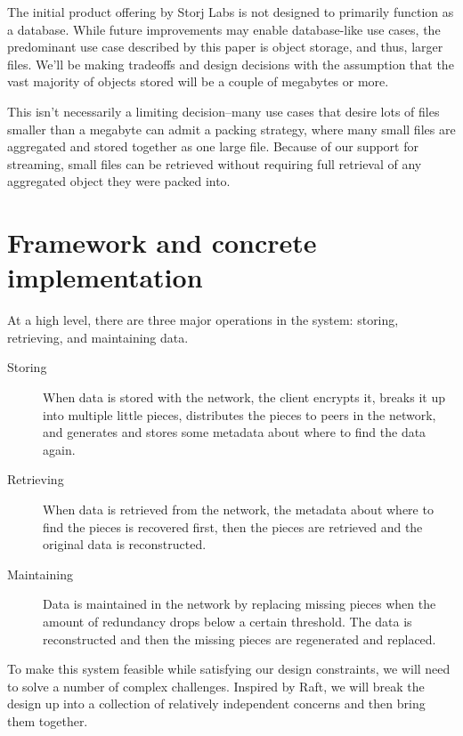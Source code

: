 \documentclass[a4paper,10pt]{article}
\begin{document}
The initial product offering by Storj Labs is not designed to primarily function
as a database. While future improvements may enable database-like use cases,
the predominant use case described by this paper is object storage, and thus,
larger files. We'll be making tradeoffs and design decisions with the assumption
that the vast majority of objects stored will be a couple of megabytes or more.

This isn't necessarily a limiting decision--many use cases that desire lots
of files smaller than a megabyte can admit a packing strategy, where many small
files are aggregated and stored together as one large file. Because of our
support for streaming, small files can be retrieved without requiring full
retrieval of any aggregated object they were packed into.

\section{Framework and concrete implementation}

At a high level, there are three major operations in the system: storing,
retrieving, and maintaining data.

\begin{description}

\item[Storing]
When data is stored with the network, the client encrypts it, breaks it up into
multiple little pieces, distributes the pieces to peers in the network, and
generates and stores some metadata about where to find the data again.

\item[Retrieving]
When data is retrieved from the network, the metadata about where to find the
pieces is recovered first, then the pieces are retrieved and the original data
is reconstructed.

\item[Maintaining]
Data is maintained in the network by replacing missing pieces when the amount
of redundancy drops below a certain threshold. The data is reconstructed and
then the missing pieces are regenerated and replaced.

\end{description}

To make this system feasible while satisfying our design constraints, we will
need to solve a number of complex challenges. Inspired by Raft\cite{raft}, we
will break the design up into a collection of relatively independent concerns
and then bring them together.
\end{document}
